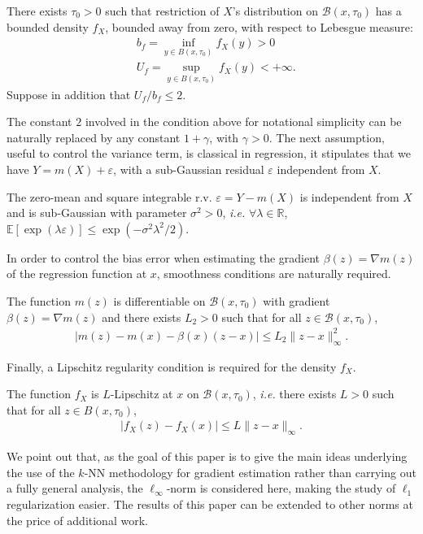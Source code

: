 \begin{assumption}\label{cond:density}
There exists $\tau_0>0$ such that restriction of $X$'s distribution on $\mathcal{B}(x, \tau_0)$ has a bounded density $f_X$, bounded away from zero, with respect to Lebesgue measure:
\begin{align*}
&b_f = \inf _{y\in B(x, \tau_0)}  f_X (y)>0 \\ 
&U_f = \sup _{y\in B(x, \tau_0)}  f_X (y)< +\infty.
\end{align*}
Suppose in addition that $U_f/ b_f\leq 2$.
\end{assumption}
The constant $2$ involved in the condition above for notational simplicity can be naturally replaced by any constant $1+\gamma$, with $\gamma>0$. The next assumption, useful to control the variance term, is classical in regression, it stipulates that we have $Y=m(X)+\varepsilon$, with a sub-Gaussian residual $\varepsilon$ independent from $X$.
\begin{assumption}\label{cond:sub_gaussian_inovation}
The zero-mean and square integrable r.v. $\varepsilon = Y-m(X)$ is independent from $X$ and is sub-Gaussian with parameter $\sigma^2>0$, \textit{i.e.} $\forall \lambda\in \mathbb R$, $\mathbb{E} [\exp ( \lambda \varepsilon ) ] \leq \exp( - \sigma^2 \lambda^2/2) $.  
\end{assumption}

In order to control the bias error when estimating the gradient $\beta(z)=\nabla m(z)$ of the regression function at $x$, smoothness conditions are naturally required.

\begin{assumption}\label{cond:lip2}
The function $m(z)$ is differentiable on $\mathcal{B}(x, \tau_0)$ with gradient $\beta(z)=\nabla m(z)$ and there exists $L_2>0$ such that for all $z \in \mathcal{B}(x, \tau_0)$,
\begin{align*}
|m (z) - m (x) - \beta(x)  (z-x) | \leq  L_2\|z-x\|_\infty ^2 .
\end{align*}
\end{assumption}

Finally, a Lipschitz regularity condition is required for the density $f_X$.

\begin{assumption}\label{cond:lip3}
The function $f_X$ is $L$-Lipschitz at $x$ on $\mathcal{B}(x, \tau_0)$, \textit{i.e.} there exists $L>0$ such that for all $z \in B(x, \tau_0)$,
\begin{align*}
|f_X (z) - f_X(x) | \leq  L\|z-x\|_\infty  .
\end{align*}
\end{assumption}

We point out that, as the goal of this paper is to give the main ideas underlying the use of the $k$-NN methodology for gradient estimation rather than carrying out a fully general analysis,  the $\ell_\infty$-norm is considered here, making the study of $\ell_1$ regularization easier. The results of this paper can be extended to other norms at the price of additional work.
